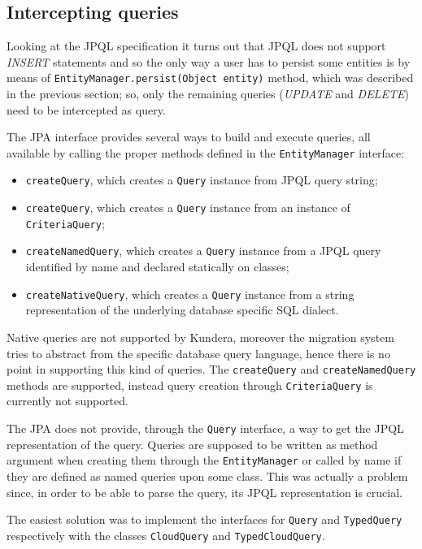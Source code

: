 \subsection{Intercepting queries}
\label{sec:cpim-intercept-queries}
Looking at the JPQL specification \cite{book:projpa2} it turns out that JPQL does not support \textit{INSERT} statements and so the only way a user has to persist some entities is by means of \texttt{EntityManager.persist(Object entity)} method, which was described in the previous section; so, only the remaining queries (\textit{UPDATE} and \textit{DELETE}) need to be intercepted as query.

\noindent The JPA interface provides several ways to build and execute queries, all available by calling the proper methods defined in the \texttt{EntityManager} interface: 
\begin{itemize}
\item \texttt{createQuery}, which creates a \texttt{Query} instance from JPQL query string;
\item \texttt{createQuery}, which creates a \texttt{Query} instance from an instance of \texttt{CriteriaQuery};
\item \texttt{createNamedQuery}, which creates a \texttt{Query} instance from a JPQL query identified by name and declared statically on classes; 
\item \texttt{createNativeQuery}, which creates a \texttt{Query} instance from a string representation of the underlying database specific SQL dialect.
\end{itemize}
 
\noindent Native queries are not supported by Kundera, moreover the migration system tries to abstract from the specific database query language, hence there is no point in supporting this kind of queries. The \texttt{createQuery} and \texttt{createNamedQuery} methods are supported, instead query creation through \texttt{CriteriaQuery} is currently not supported.

\newparagraph The JPA does not provide, through the \texttt{Query} interface, a way to get the JPQL representation of the query. Queries are supposed to be written as method argument when creating them through the \texttt{EntityManager} or called by name if they are defined as named queries upon some class.
This was actually a problem since, in order to be able to parse the query, its JPQL representation is crucial.

\noindent The easiest solution was to implement the interfaces for \texttt{Query} and \texttt{TypedQuery} respectively with the classes \texttt{CloudQuery} and \texttt{TypedCloudQuery}. 

